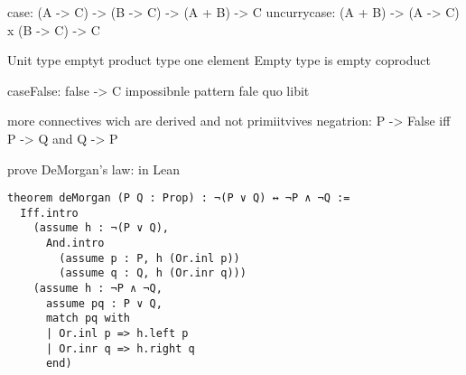 case: (A -> C) -> (B -> C) -> (A + B) -> C
uncurrycase: (A + B) -> (A -> C) x (B -> C) -> C


Unit type emptyt product type one element
Empty type is empty coproduct

caseFalse: false -> C
impossibnle pattern
fale quo libit


more connectives wich are derived and not primiitvives
negatrion: P -> False
iff P -> Q and Q -> P

prove DeMorgan's law: in Lean
\begin{lstlisting}[language=Lean]   
theorem deMorgan (P Q : Prop) : ¬(P ∨ Q) ↔ ¬P ∧ ¬Q :=
  Iff.intro
    (assume h : ¬(P ∨ Q),
      And.intro
        (assume p : P, h (Or.inl p))
        (assume q : Q, h (Or.inr q)))
    (assume h : ¬P ∧ ¬Q,
      assume pq : P ∨ Q,
      match pq with
      | Or.inl p => h.left p
      | Or.inr q => h.right q
      end)
\end{lstlisting}